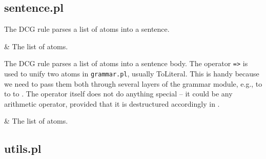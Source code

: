 \subsection{sentence.pl}

\label{sec:sentence}

\begin{description}
The  DCG rule parses a list of atoms into a sentence.

\begin{arguments}
 & The list of atoms. \\
\end{arguments}

The  DCG rule parses a list of atoms into a sentence body.
The operator \verb$=>$ is used to unify two atoms in \verb$grammar.pl$, usually ToLiteral.
This is handy because we need to pass them both through several layers of the grammar module,
e.g.,  to  to  to .
The operator itself does not do anything special -- it could be any arithmetic operator,
provided that it is destructured accordingly in .

\begin{arguments}
 & The list of atoms. \\
\end{arguments}
\end{description}

\subsection{utils.pl}

\label{sec:utils}

